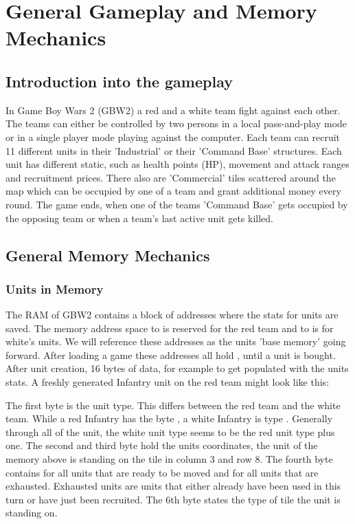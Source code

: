 \section{General Gameplay and Memory Mechanics}

\subsection{Introduction into the gameplay}
In Game Boy Wars 2 (GBW2) a red and a white team fight against each other. The teams can either be controlled by two persons in a local pass-and-play mode or in a single player mode playing against the computer.
Each team can recruit 11 different units in their 'Industrial' or their 'Command Base' structures.
Each unit has different static, such as health points (HP), movement and attack ranges and recruitment prices.
There also are 'Commercial' tiles scattered around the map which can be occupied by one of a team and grant additional money every round.
The game ends, when one of the teams 'Command Base' gets occupied by the opposing team or when a team's last active unit gets killed.

\subsection{General Memory Mechanics}
\subsubsection{Units in Memory}
The RAM of GBW2 contains a block of addresses where the stats for units are saved. The memory address space  to  is reserved for the red team and  to  is for white's units. We will reference these addresses as the units 'base memory' going forward.
After loading a game these addresses all hold , until a unit is bought.
After unit creation, 16 bytes of data, for example  to  get populated with the units stats.
A freshly generated Infantry unit on the red team might look like this:


The first byte is the unit type. This differs between the red team and the white team. While a red Infantry has the byte , a white Infantry is type . Generally through all of the unit, the white unit type seems to be the red unit type plus one.
The second and third byte hold the units coordinates, the unit of the memory above is standing on the tile in column 3 and row 8. The fourth byte contains  for all units that are ready to be moved and  for all units that are exhausted. Exhausted units are units that either already have been used in this turn or have just been recruited.
The 6th byte states the type of tile the unit is standing on.


